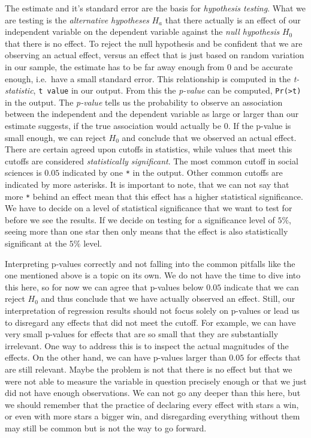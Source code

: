 \documentclass[
]{book}
\begin{document}
The estimate and it's standard error are the basis for \emph{hypothesis testing}.
What we are testing is the \emph{alternative hypotheses} \(H_a\) that there actually
is an effect of our independent variable on the dependent variable against the
\emph{null hypothesis} \(H_0\) that there is no effect. To reject the null hypothesis
and be confident that we are observing an actual effect, versus an effect that
is just based on random variation in our sample, the estimate has to be far
away enough from \(0\) and be accurate enough, i.e.~have a small standard error.
This relationship is computed in the \emph{t-statistic}, \texttt{t\ value} in
our output. From this the \emph{p-value} can be computed, \texttt{Pr(\textgreater{}\textbar{}t\textbar{})} in the output.
The \emph{p-value} tells us the probability to observe an association
between the independent and the dependent variable as large or larger than our
estimate suggests, if the true association would actually be \(0\). If the p-value
is small enough, we can reject \(H_0\) and conclude that we observed an actual
effect. There are certain agreed upon cutoffs in statistics, while values that
meet this cutoffs are considered \emph{statistically significant}. The most common
cutoff in social sciences is \(0.05\) indicated by one \texttt{*} in the output.
Other common cutoffs are indicated by more asterisks. It is important to note,
that we can not say that more \texttt{*} behind an effect mean that this effect has a
higher statistical significance. We have to decide on a level of statistical
significance that we want to test for before we see the results. If we decide on
testing for a significance level of \(5\%\), seeing more than one star then only
means that the effect is also statistically significant at the \(5\%\) level.

Interpreting p-values correctly and not falling into the common pitfalls like the
one mentioned above is a
topic on its own. We do not have the time to dive into this here, so for now we
can agree that p-values below \(0.05\) indicate that we can reject \(H_0\) and thus
conclude that we have actually observed an effect. Still, our interpretation of
regression results should not focus solely on p-values or lead us to disregard
any effects that did not meet the cutoff. For example, we can have very small
p-values for effects that are so small that they are substantially irrelevant.
One way to address this is to inspect the actual magnitudes of the effects.
On the other hand, we
can have p-values larger than \(0.05\) for effects that are still relevant. Maybe
the problem is not that there is no effect but that we were not able to measure
the variable in question precisely enough or that we just did not have enough
observations. We can not go any deeper than this here, but we should remember
that the practice of declaring every effect with stars a win, or even with more
stars a bigger win, and disregarding
everything without them may still be common but is not the way to go forward.
\end{document}
